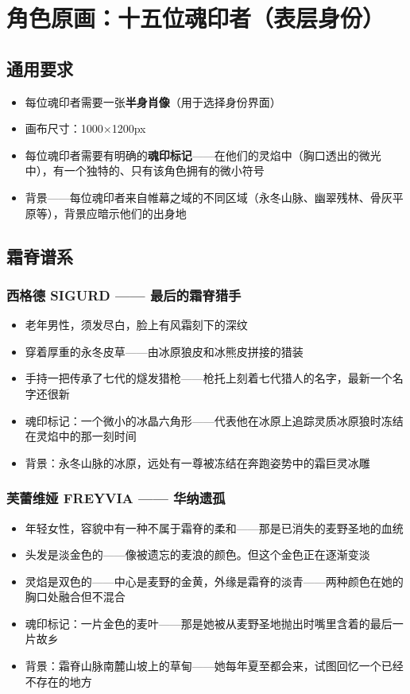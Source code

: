 \documentclass[12pt,a4paper,openany]{ctexbook}
\begin{document}
\chapter{角色原画：十五位魂印者（表层身份）}

\section{通用要求}

\begin{itemize}
    \item 每位魂印者需要一张\textbf{半身肖像}（用于选择身份界面）
    \item 画布尺寸：1000×1200px
    \item 每位魂印者需要有明确的\textbf{魂印标记}——在他们的灵焰中（胸口透出的微光中），有一个独特的、只有该角色拥有的微小符号
    \item 背景——每位魂印者来自帷幕之域的不同区域（永冬山脉、幽翠残林、骨灰平原等），背景应暗示他们的出身地
\end{itemize}

\section{霜脊谱系}

\subsection{西格德 SIGURD —— 最后的霜脊猎手}
\begin{itemize}
    \item 老年男性，须发尽白，脸上有风霜刻下的深纹
    \item 穿着厚重的永冬皮草——由冰原狼皮和冰熊皮拼接的猎装
    \item 手持一把传承了七代的燧发猎枪——枪托上刻着七代猎人的名字，最新一个名字还很新
    \item 魂印标记：一个微小的冰晶六角形——代表他在冰原上追踪灵质冰原狼时冻结在灵焰中的那一刻时间
    \item 背景：永冬山脉的冰原，远处有一尊被冻结在奔跑姿势中的霜巨灵冰雕
\end{itemize}

\subsection{芙蕾维娅 FREYVIA —— 华纳遗孤}
\begin{itemize}
    \item 年轻女性，容貌中有一种不属于霜脊的柔和——那是已消失的麦野圣地的血统
    \item 头发是淡金色的——像被遗忘的麦浪的颜色。但这个金色正在逐渐变淡
    \item 灵焰是双色的——中心是麦野的金黄，外缘是霜脊的淡青——两种颜色在她的胸口处融合但不混合
    \item 魂印标记：一片金色的麦叶——那是她被从麦野圣地抛出时嘴里含着的最后一片故乡
    \item 背景：霜脊山脉南麓山坡上的草甸——她每年夏至都会来，试图回忆一个已经不存在的地方
\end{itemize}
\end{document}
